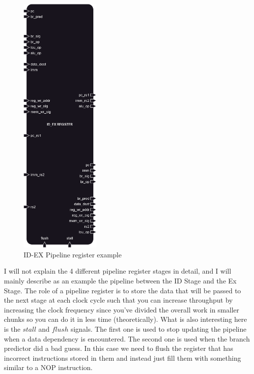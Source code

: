 \begin{figure}[H]
    \centering
    \includegraphics[width=0.35\textwidth]{design/pipelined/pipeline/images/pipeline.png}
    \caption{ID-EX Pipeline register example}
    \label{fig:pipeline}
\end{figure}

I will not explain the 4 different pipeline register stages in detail, and I will mainly describe as an example the 
pipeline between the ID Stage and the Ex Stage. The role of a pipeline register is to store the data that will be
passed to the next stage at each clock cycle such that you can increase throughput by increasing the clock frequency since 
you've divided the overall work in smaller chunks so you can do it in less time (theoretically).
What is also interesting here is the $stall$ and $flush$ signals. The first one is used to stop updating the pipeline when 
a data dependency is encountered. The second one is used when the branch predictor did a bad guess. In this case we need to 
flush the register that has incorrect instructions stored in them and instead just fill them with something similar to a NOP 
instruction.